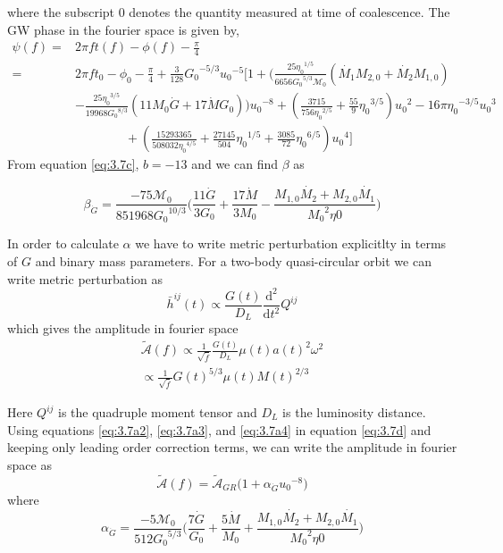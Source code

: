 \documentclass[11pt]{article}
\begin{document}
where the subscript $0$ denotes the quantity measured at time of coalescence. The GW phase in the fourier space is given by,
\begin{align}\label{eq:3.7c}
\psi(f)=&2\pi ft(f)-\phi(f)-\frac{\pi}{4}\nonumber\\
=&2\pi f t_0-\phi_0-\frac{\pi}{4}+\frac{3}{128}{G_0}^{-5/3}{u_0}^{-5}\bigg[1+\big(\frac{25{\eta_0}^{1/5}}{6656{G_0}^{5/3}{\mathcal{M}}_0}(\dot{M_1}M_{2,0}+\dot{M_2}M_{1,0})\nonumber\\&-\frac{25{\eta_0}^{3/5}}{19968{G_0}^{8/3}}(11M_0\dot{G}+17\dot{M}G_0)\big){u_0}^{-8}+(\frac{3715}{756{\eta_0}^{2/5}}+\frac{55}{9}{\eta_0}^{3/5}){u_0}^2-16\pi{\eta_0}^{-3/5}{u_0}^3 &\nonumber\\&\qquad\qquad+(\frac{15293365}{508032{\eta_0}^{4/5}}+\frac{27145}{504}{\eta_0}^{1/5}+\frac{3085}{72}{\eta_0}^{6/5}){u_0}^4\bigg]
\end{align}
\hspace*{15.5pt}From equation \eqref{eq:3.7c}, $b=-13$  and we can find $\beta$ as

 \begin{equation}
 \beta_{\dot{G}}=\frac{-75 \mathcal{M}_0}{851968 {G_0}^{10/3}} \bigg(\frac{11 \dot{G}}{3 G_0} + \frac{17 \dot{M}}{3M_0}-\frac{M_{1,0}\dot{M_2}+M_{2,0}\dot{M_1}}{{M_0}^2 \eta0}\bigg)
  \end{equation}
 
 \hspace*{15.5pt}In order to calculate $\alpha$ we have to write metric perturbation explicitlty in terms of $G$ and binary mass parameters. For a two-body quasi-circular orbit we can write metric perturbation as \cite{Blanchet:2002av}
 \begin{equation}
\bar{h}^{ij}(t)\propto \frac{G(t)}{D_L}\frac{\mathrm{d^2} }{\mathrm{d} t^2}Q^{ij}
 \end{equation}
which gives the amplitude in fourier space
\begin{align}\label{eq:3.7d}
\tilde{\mathcal{A}}(f)\propto\frac{1}{\sqrt{\dot{f}}}\frac{G(t)}{D_L}\mu(t) a(t)^2\omega^2\nonumber\\\propto\frac{1}{\sqrt{\dot{f}}}{G(t)}^{5/3}\mu(t){M(t)}^{2/3}
\end{align} 
 

\hspace*{15.5pt}Here $Q^{ij}$ is the quadruple moment tensor and $D_L$ is the luminosity distance. Using equations \eqref{eq:3.7a2}, \eqref{eq:3.7a3}, and \eqref{eq:3.7a4} in equation \eqref{eq:3.7d} and keeping only leading order correction terms, we can write the amplitude in fourier space as
\begin{equation}
\tilde{\mathcal{A}}(f)=\tilde{\mathcal{A}}_{GR}\big(1+\alpha_{\dot{G}}{u_0}^{-8}\big)
\end{equation}
where
\begin{equation}
 \alpha_{\dot{G}}=\frac{-5\mathcal{M}_0}{512 {G_0}^{5/3}} \bigg(\frac{7 \dot{G}}{ G_0} + \frac{5\dot{M}}{M_0}+\frac{M_{1,0}\dot{M_2}+M_{2,0}\dot{M_1}}{{M_0}^2 \eta0}\bigg)
 \end{equation}
 
\end{document}
